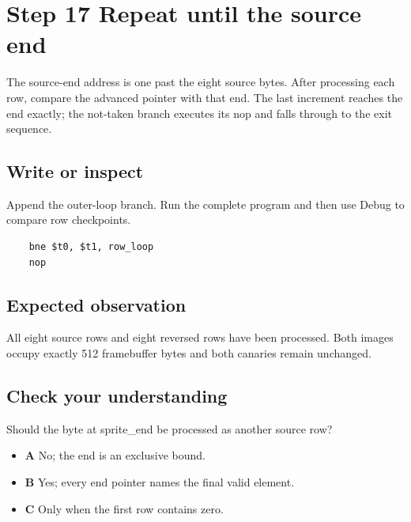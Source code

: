 \section{Step 17 Repeat until the source
  end}\label{003-eight-byte-sprite-s17-step-17-repeat-until-the-source-end}

The source-end address is one past the eight source bytes. After
processing each row, compare the advanced pointer with that end. The
last increment reaches the end exactly; the not-taken branch executes
its nop and falls through to the exit sequence.

\subsection{Write or
  inspect}\label{003-eight-byte-sprite-s17-write-or-inspect}

Append the outer-loop branch. Run the complete program and then use
Debug to compare row checkpoints.

\begin{verbatim}
    bne $t0, $t1, row_loop
    nop
\end{verbatim}

\subsection{Expected
  observation}\label{003-eight-byte-sprite-s17-expected-observation}

All eight source rows and eight reversed rows have been processed. Both
images occupy exactly 512 framebuffer bytes and both canaries remain
unchanged.

\subsection{Check your
  understanding}\label{003-eight-byte-sprite-s17-check-your-understanding}

Should the byte at sprite\_end be processed as another source row?

\begin{itemize}
  \tightlist
  \item
        \textbf{A} No; the end is an exclusive bound.
  \item
        \textbf{B} Yes; every end pointer names the final valid element.
  \item
        \textbf{C} Only when the first row contains zero.
\end{itemize}
